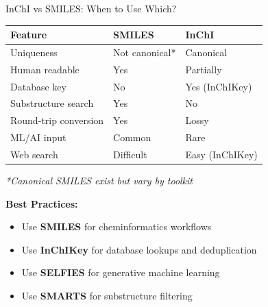 \documentclass{beamer}
\begin{document}
\begin{frame}{InChI vs SMILES: When to Use Which?}
    \small
    \begin{tabular}{lll}
        \textbf{Feature} & \textbf{SMILES} & \textbf{InChI} \\
        \hline
        Uniqueness & Not canonical* & Canonical \\
        Human readable & Yes & Partially \\
        Database key & No & Yes (InChIKey) \\
        Substructure search & Yes & No \\
        Round-trip conversion & Yes & Lossy \\
        ML/AI input & Common & Rare \\
        Web search & Difficult & Easy (InChIKey) \\
    \end{tabular}
    \vspace{0.5em}
    
    \textit{*Canonical SMILES exist but vary by toolkit}
    \vspace{0.3em}
    
    \textbf{Best Practices:}
    \begin{itemize}
        \item Use \textbf{SMILES} for cheminformatics workflows
        \item Use \textbf{InChIKey} for database lookups and deduplication
        \item Use \textbf{SELFIES} for generative machine learning
        \item Use \textbf{SMARTS} for substructure filtering
    \end{itemize}
\end{frame}
\end{document}

